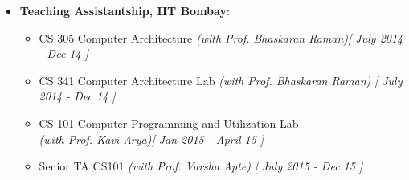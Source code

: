 \begin{itemize}
	\item \textbf{Teaching Assistantship, IIT Bombay}: \hfill \\[-0.6cm]
	\begin{itemize}
		\item CS 305 Computer Architecture  \hfill \emph{(with Prof. Bhaskaran Raman)}\hfill {\emph{[ July 2014 - Dec 14 ]}}  \\[-0.6cm]
		\item CS 341 Computer Architecture Lab \hfill \emph{(with Prof. Bhaskaran Raman)} \hfill {\emph{[ July 2014 - Dec 14 ]}} \\[-0.6cm]
		\item CS 101  Computer Programming and Utilization Lab \\
		\hfill \emph{(with Prof. Kavi Arya)}\hfill {\emph{[ Jan 2015 - April 15 ]}} \\[-0.6cm]
  \item Senior TA CS101 \hfill \emph{(with Prof.  Varsha Apte)} \hfill {\emph{[ July 2015 - Dec 15 ]}} 
	\end{itemize}
\end{itemize}

